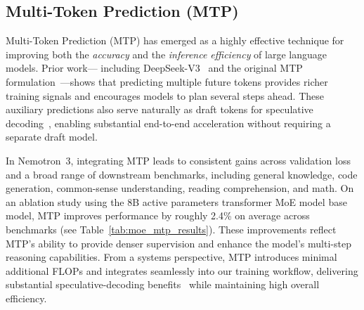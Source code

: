 \subsection{Multi-Token Prediction (MTP)}
\label{subsec:mtp}
Multi-Token Prediction (MTP) has emerged as a highly effective technique for improving both the 
\emph{accuracy} and the \emph{inference efficiency} of large language models. Prior work—
including DeepSeek-V3~\citep{deepseekai2025deepseekv3technicalreport} and the original MTP 
formulation~\citep{gloeckle2024better}—shows that predicting multiple future tokens provides richer 
training signals and encourages models to plan several steps ahead. These auxiliary predictions also 
serve naturally as draft tokens for speculative decoding~\citep{leviathan2023fast}, enabling 
substantial end-to-end acceleration without requiring a separate draft model.

In Nemotron~3, integrating MTP leads to consistent gains across validation loss and a broad range of downstream benchmarks, including general knowledge, code generation, common-sense understanding, reading comprehension, and math. On an ablation study using the 8B active parameters transformer MoE model base model, MTP improves performance by roughly 2.4\% on average across benchmarks (see Table~\ref{tab:moe_mtp_results}). These improvements reflect MTP’s ability to provide denser supervision and enhance the model’s multi-step reasoning capabilities. From a systems perspective, MTP introduces minimal additional FLOPs and integrates seamlessly into our training workflow, delivering substantial speculative-decoding benefits~\citep{gloeckle2024better} while maintaining high overall efficiency.


